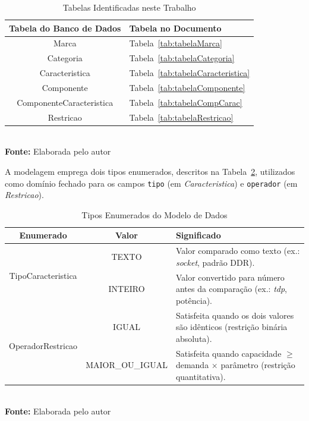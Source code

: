 \FloatBarrier
\begin{table}[!htbp]
  \centering
  \caption{Tabelas Identificadas neste Trabalho}
  \begin{tabular}{ c | p{8cm} }
    \hline
    \textbf{Tabela do Banco de Dados} & \textbf{Tabela no Documento}          \\ \hline
    Marca                             & Tabela~\ref{tab:tabelaMarca}          \\ \hline
    Categoria                         & Tabela~\ref{tab:tabelaCategoria}      \\ \hline
    Caracteristica                    & Tabela~\ref{tab:tabelaCaracteristica} \\ \hline
    Componente                        & Tabela~\ref{tab:tabelaComponente}     \\ \hline
    ComponenteCaracteristica          & Tabela~\ref{tab:tabelaCompCarac}      \\ \hline
    Restricao                         & Tabela~\ref{tab:tabelaRestricao}      \\ \hline
  \end{tabular}
  \\ \vspace{0.2cm}
  \textbf{Fonte:} Elaborada pelo autor
  \label{tab:tabelasIdentificadas}
\end{table}
\FloatBarrier

A modelagem emprega dois tipos enumerados, descritos na Tabela~\ref{tab:enums}, utilizados como domínio fechado para os campos \texttt{tipo} (em \textit{Caracteristica}) e \texttt{operador} (em \textit{Restricao}).

\FloatBarrier
\begin{table}[!htbp]
  \centering
  \caption{Tipos Enumerados do Modelo de Dados}
  \begin{tabular}{ c | c | p{7.5cm} }
    \hline
    \textbf{Enumerado}                  & \textbf{Valor}   & \textbf{Significado}                                                                     \\ \hline
    \multirow{2}{*}{TipoCaracteristica} & TEXTO            & Valor comparado como texto (ex.: \textit{socket}, padrão DDR).                           \\ \cline{2-3}
                                        & INTEIRO          & Valor convertido para número antes da comparação (ex.: \textit{tdp}, potência).          \\ \hline
    \multirow{2}{*}{OperadorRestricao}  & IGUAL            & Satisfeita quando os dois valores são idênticos (restrição binária absoluta).            \\ \cline{2-3}
                                        & MAIOR\_OU\_IGUAL & Satisfeita quando capacidade $\geq$ demanda $\times$ parâmetro (restrição quantitativa). \\ \hline
  \end{tabular}
  \\ \vspace{0.2cm}
  \textbf{Fonte:} Elaborada pelo autor
  \label{tab:enums}
\end{table}
\FloatBarrier

